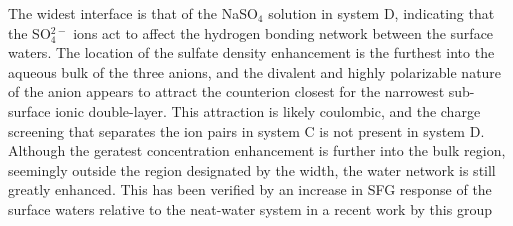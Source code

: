 The widest interface is that of the NaSO$_4$ solution in system D, indicating that the SO$_4^{2-}$ ions act to affect the hydrogen bonding network between the surface waters. The location of the sulfate density enhancement is the furthest into the aqueous bulk of the three anions, and the divalent and highly polarizable nature of the anion appears to attract the counterion closest for the narrowest sub-surface ionic double-layer. This attraction is likely coulombic, and the charge screening that separates the ion pairs in system C is not present in system D. Although the geratest concentration enhancement is further into the bulk region, seemingly outside the region designated by the width, the water network is still greatly enhanced. This has been verified by an increase in SFG response of the surface waters relative to the neat-water system in a recent work by this group\cite{McFearin2009}




